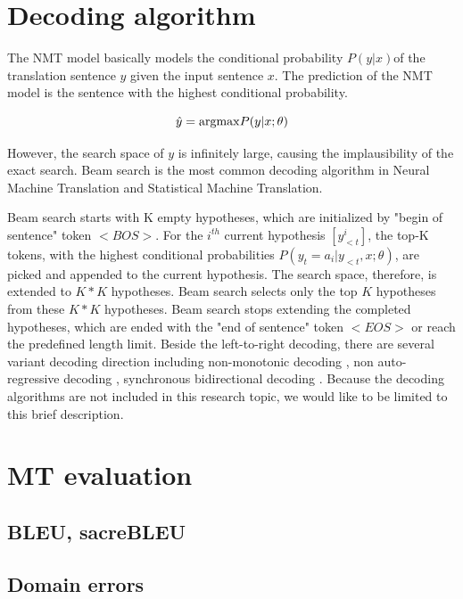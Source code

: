 \section{Decoding algorithm} \label{sec:inference}
The NMT model basically models the conditional probability $P(y|x)$of the translation sentence $y$ given the input sentence $x$. The prediction of the NMT model is the sentence with the highest conditional probability.

\begin{equation}
\hat{y} = \displaystyle{\mathop{\operatorname*{argmax}}} P(y|x;\theta)
\end{equation}

However, the search space of $y$ is infinitely large, causing the implausibility of the exact search. Beam search \citep{Och98improving} is the most common decoding algorithm in Neural Machine Translation and Statistical Machine Translation. 

Beam search starts with K empty hypotheses, which are initialized by "begin of sentence" token $<BOS>$. For the $i^{th}$ current hypothesis $[y^{i}_{<t}]$, the top-K tokens, with the highest conditional probabilities $P(y_t = a_i | y_{<t},x;\theta)$, are picked and appended to the current hypothesis. The search space, therefore, is extended to $K*K$ hypotheses. Beam search selects only the top $K$ hypotheses from these $K*K$ hypotheses. Beam search stops extending the completed hypotheses, which are ended with the "end of sentence" token $<EOS>$ or reach the predefined length limit. Beside the left-to-right decoding, there are several variant decoding direction including non-monotonic decoding \citep{Welleck19non}, non auto-regressive decoding \citep{Jiatao17non}, synchronous bidirectional decoding \cite{Zhou19synchronous}. Because the decoding algorithms are not included in this research topic, we would like to be limited to this brief description.

\section{MT evaluation}
\subsection{BLEU, sacreBLEU}
\subsection{Domain errors}






































